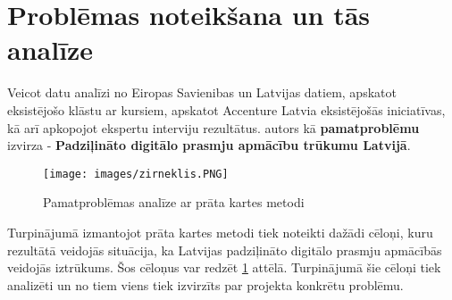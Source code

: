\section{Problēmas noteikšana un tās analīze}
Veicot datu analīzi no Eiropas Savienibas un Latvijas datiem, apskatot eksistējošo klāstu ar kursiem,
apskatot Accenture Latvia eksistējošās iniciatīvas, kā arī apkopojot ekspertu interviju rezultātus. 
autors kā \textbf{pamatproblēmu} izvirza - \textbf{Padziļināto digitālo prasmju apmācību trūkumu Latvijā}.
\clearpage
\begin{figure}[h]
    \centering
    \caption{Pamatproblēmas analīze ar prāta kartes metodi}
    \author{Autora veidots}
    \texttt{[image: images/zirneklis.PNG]}
    \label{fig:zirneklis}
\end{figure}
Turpinājumā izmantojot prāta kartes metodi tiek noteikti dažādi cēloņi, kuru rezultātā veidojās situācija,
ka Latvijas padziļināto digitālo prasmju apmācībās veidojās iztrūkums. Šos cēloņus var redzēt \ref{fig:zirneklis}
attēlā. Turpinājumā šie cēloņi tiek analizēti un no tiem viens tiek izvirzīts par projekta konkrētu problēmu.
